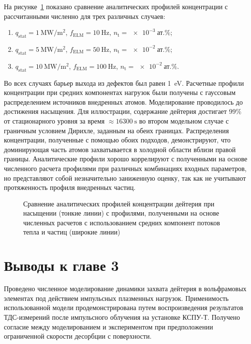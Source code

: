 На рисунке~\cref{fig:ch3/retention_saturation} показано сравнение аналитических профилей концентрации с рассчитанными численно для трех различных случаев:
\begin{enumerate}[beginpenalty=10000]
	\item $q_{\mathrm{stat}}=\SI{1}{\mega\watt\per\meter\squared}$, $f_{\mathrm{ELM}}=\SI{10}{\hertz}$, $n_{\mathrm{t}}=\SI{e-3}{\text{ат.}\percent}$;
	\item $q_{\mathrm{stat}}=\SI{5}{\mega\watt\per\meter\squared}$, $f_{\mathrm{ELM}}=\SI{50}{\hertz}$, $n_{\mathrm{t}}=\SI{e-2}{\text{ат.}\percent}$;
	\item $q_{\mathrm{stat}}=\SI{10}{\mega\watt\per\meter\squared}$, $f_{\mathrm{ELM}}=\SI{100}{\hertz}$, $n_{\mathrm{t}}=\SI{e-2}{\text{ат.}\percent}$.	
\end{enumerate}
Во всех случаях барьер выхода из дефектов был равен \SI{1}{\electronvolt}. Расчетные профили концентрации при средних компонентах нагрузок были получены с гауссовым распределением источников внедренных атомов. Моделирование проводилось до достижения насыщения. Для иллюстрации, содержание дейтерия достигает 99\% от стационарного уровня за время $\approx\SI{16300}{\second}$ во втором модельном случае с граничным условием Дирихле, заданным на обеих границах. Распределения концентрации, полученные с помощью обоих подходов, демонстрируют, что доминирующая часть атомов захватывается в холодной области вблизи правой границы. Аналитические профили хорошо коррелируют с полученными на основе численного расчета профилями при различных комбинациях входных параметров, но представляют собой незначительно заниженную оценку, так как не учитывают протяженность профиля внедренных частиц. 

\begin{figure}[ht]
	\caption{Сравнение аналитических профилей концентрации дейтерия при насыщении (тонкие линии) с профилями, полученными на основе численных расчетов с использованием средних компонент потоков тепла и частиц (широкие линии)}\label{fig:ch3/retention_saturation}
\end{figure}


\section{Выводы к главе 3}
Проведено численное моделирование динамики захвата дейтерия в вольфрамовых элементах под действием импульсных плазменных нагрузок. Применимость использованной модели продемонстрирована путем воспроизведения результатов ТДС-измерений после импульсного облучения на установке КСПУ-Т. Получено согласие между моделированием и экспериментом при предположении ограниченной скорости десорбции с поверхности.   

